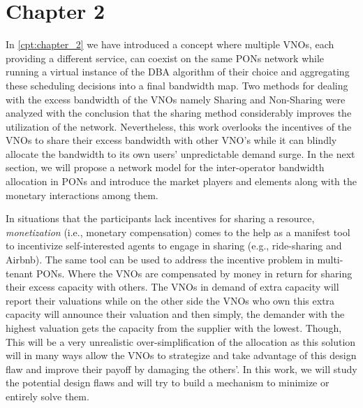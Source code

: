 \chapter*{Chapter 2}


In \autoref{cpt:chapter_2} we have introduced a concept where multiple \acfp{VNO}, each providing a different service, can coexist on the same \acp{PON} network while running a virtual instance of the \ac{DBA} algorithm of their choice and aggregating these scheduling decisions into a final bandwidth map. Two methods for dealing with the excess bandwidth of the \acp{VNO} namely Sharing and Non-Sharing were analyzed with the conclusion that the sharing method considerably improves the utilization of the network. Nevertheless, this work overlooks the incentives of the \acp{VNO} to share their excess bandwidth with other \ac{VNO}'s while it can blindly allocate the bandwidth to its own users' unpredictable demand surge. In the next section, we will propose a network model for the inter-operator bandwidth allocation in \acp{PON} and introduce the market players and elements along with the monetary interactions among them.




In situations that the participants lack incentives for sharing a resource, \textit{monetization} (i.e., monetary compensation) comes to the help as a manifest tool to incentivize self-interested agents to engage in sharing (e.g., ride-sharing and Airbnb). The same tool can be used to address the incentive problem in multi-tenant \acp{PON}. Where the \acp{VNO} are compensated by money in return for sharing their excess capacity with others. The \acp{VNO} in demand of extra capacity will report their valuations while on the other side the \acp{VNO} who own this extra capacity will announce their valuation and then simply, the demander with the highest valuation gets the capacity from the supplier with the lowest. Though, This will be a very unrealistic over-simplification of the allocation as this solution will in many ways allow the \acp{VNO} to strategize and take advantage of this design flaw and improve their payoff by damaging the others'. In this work, we will study the potential design flaws and will try to build a mechanism to minimize or entirely solve them.
